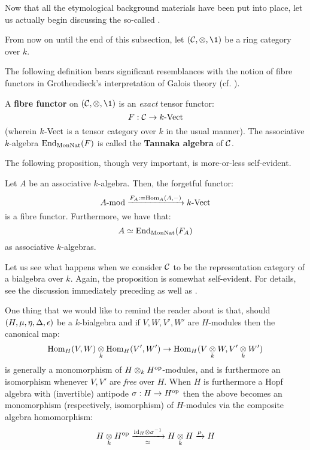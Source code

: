         Now that all the etymological background materials have been put into place, let us actually begin discussing the so-called . 
        \begin{convention}
            From now on until the end of this subsection, let $(\C, \tensor, \1)$ be a ring category over $k$. 
        \end{convention}
        The following definition bears significant resemblances with the notion of fibre functors in Grothendieck's interpretation of Galois theory (cf. \cite[Expos\'e V]{SGA1}).
        \begin{definition} \label{def: fibre_functors}
            A \textbf{fibre functor} on $(\C, \tensor, \1)$ is an \textit{exact} tensor functor:
                $$F: \mathcal{C} \to k\text{-}\mathrm{Vect}$$
            (wherein $k\text{-}\mathrm{Vect}$ is a tensor category over $k$ in the usual manner). The associative $k$-algebra $\mathrm{End}_{\mathrm{Mon}\mathrm{Nat}}(F)$ is called the \textbf{Tannaka algebra} of $\mathcal{C}$.
        \end{definition}
        The following proposition, though very important, is more-or-less self-evident. 
        \begin{proposition} \label{prop: fibre_functors_for_representation_categories_of_associative_algebras}
            Let $A$ be an associative $k$-algebra. Then, the forgetful functor:
                $$A\text{-}\mathrm{mod} \xrightarrow[]{F_A := \mathrm{Hom}_A(A, -)} k\text{-}\mathrm{Vect}$$
            is a fibre functor. Furthermore, we have that:
                $$A \simeq \mathrm{End}_{\mathrm{Mon}\mathrm{Nat}}(F_A)$$
            as associative $k$-algebras. 
        \end{proposition}
        Let us see what happens when we consider $\mathcal{C}$ to be the representation category of a bialgebra over $k$. Again, the proposition is somewhat self-evident. For details, see the discussion immediately preceding \cite[Section 5.2]{EGNO_tensor_categories} as well as \cite[Section 5.3]{EGNO_tensor_categories}.
        \begin{remark}
            One thing that we would like to remind the reader about is that, should $(H, \mu, \eta, \Delta, \epsilon)$ be a $k$-bialgebra and if $V, W, V', W'$ are $H$-modules then the canonical map:
                $$\Hom_H(V, W) \tensor_k \Hom_H(V', W') \to \Hom_H(V \tensor_k W, V' \tensor_k W')$$
            is generally a monomorphism of $H \tensor_k H^{\op}$-modules, and is furthermore an isomorphism whenever $V, V'$ are \textit{free} over $H$. When $H$ is furthermore a Hopf algebra with (invertible) antipode $\sigma: H \to H^{\mathrm{op}}$ then the above becomes an monomorphism (respectively, isomorphism) of $H$-modules via the composite algebra homomorphism:
                $$H \tensor_k H^{\op} \xrightarrow[\cong]{\id_H \tensor \sigma^{-1}} H \tensor_k H \xrightarrow[]{\mu} H$$
        \end{remark}
        
